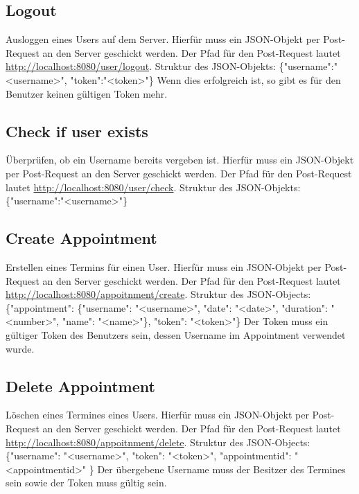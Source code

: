 \documentclass[12pt]{scrartcl}
\begin{document}
    \subsection{Logout}
        Ausloggen eines Users auf dem Server.
        Hierfür muss ein JSON-Objekt per Post-Request an den Server geschickt werden. Der Pfad für den Post-Request lautet
        \url{http://localhost:8080/user/logout}.
        Struktur des JSON-Objekts: \{"username":"<username>", "token":"<token>"\}
        Wenn dies erfolgreich ist, so gibt es für den Benutzer keinen gültigen Token mehr.

    \subsection{Check if user exists}
        Überprüfen, ob ein Username bereits vergeben ist.
        Hierfür muss ein JSON-Objekt per Post-Request an den Server geschickt werden. Der Pfad für den Post-Request lautet
        \url{http://localhost:8080/user/check}.
        Struktur des JSON-Objekts: \{"username":"<username>"\}

    \subsection{Create Appointment}
        Erstellen eines Termins für einen User.
        Hierfür muss ein JSON-Objekt per Post-Request an den Server geschickt werden. Der Pfad für den Post-Request lautet
        \url{http://localhost:8080/appoitnment/create}.
        Struktur des JSON-Objects: \{"appointment": \{"username": "<username>", "date": "<date>", "duration": "<number>", "name": "<name>"\}, "token": "<token>"\}
        Der Token muss ein gültiger Token des Benutzers sein, dessen Username im Appointment verwendet wurde.

    \subsection{Delete Appointment}
        Löschen eines Termines eines Users.
        Hierfür muss ein JSON-Objekt per Post-Request an den Server geschickt werden. Der Pfad für den Post-Request lautet
        \url{http://localhost:8080/appoitnment/delete}.
        Struktur des JSON-Objects: \{"username": "<username>", "token": "<token>", "appointmentid": "<appointmentid>" \}
        Der übergebene Username muss der Besitzer des Termines sein sowie der Token muss gültig sein.
\end{document}
